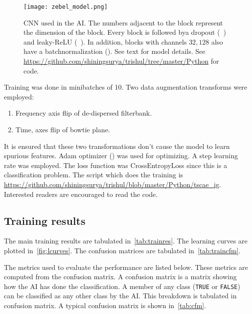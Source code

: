 \begin{figure}
	\label{fig:mlmodel}
	\centering
	\texttt{[image: zebel\_model.png]}
	\caption{CNN used in the AI. The numbers adjacent to the block represent the dimension of the block. Every block is followed bya dropout (~\cite{dropout2d,dropout}) and leaky-ReLU (~\cite{lrelu}). In addition, blocks with channels $32, 128$ also have a batchnormalization (\cite{batchnorm}). See text for model details. See \url{https://github.com/shiningsurya/trishul/tree/master/Python} for code.}
\end{figure}

\par Training was done in minibatches of 10. Two data augmentation transforms were employed:
\begin{enumerate}
	\item Frequency axis flip of de-dispersed filterbank.
	\item Time, \dm axes flip of bowtie plane.
\end{enumerate}
It is ensured that these two transformations don't cause the model to learn spurious features.
Adam optimizer (\cite{adam}) was used for optimizing. A step learning rate was employed. 
The loss function was CrossEntropyLoss since this is a classification problem.
The script which does the training is \url{https://github.com/shiningsurya/trishul/blob/master/Python/tscae_ig}.
Interested readers are encouraged to read the code.

\subsection{Training results}

\par The main training results are tabulated in~\autoref{tab:trainres}. 
The learning curves are plotted in~\autoref{fig:lcurves}.
The confusion matrices are tabulated in~\autoref{tab:traincfm}.

\par The metrics used to evaluate the performance are listed below. 
These metrics are computed from the confusion matrix.
A confusion matrix is a matrix showing how the AI has done the classification. A member of any class (\texttt{TRUE} or \texttt{FALSE}) can be classified as any other class by the AI.
This breakdown is tabulated in confusion matrix. A typical confusion matrix is shown in~\autoref{tab:cfm}.


